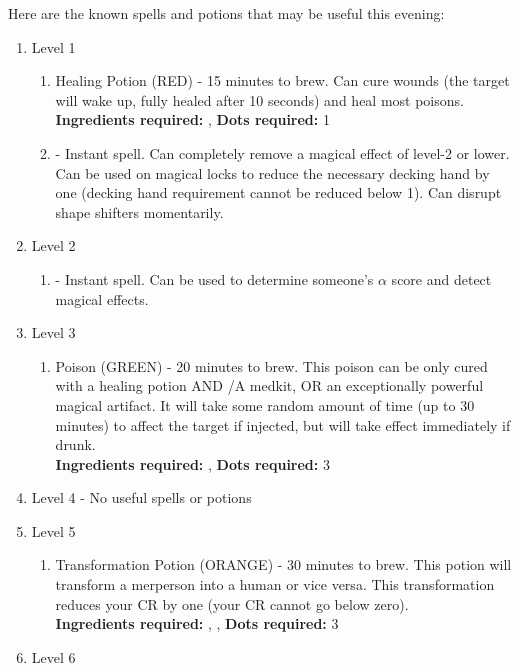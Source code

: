 \documentclass[green]{NeptuneBall}
\begin{document}
Here are the known spells and potions that may be useful this evening:
\begin{enumerate}
  \item Level 1
   \begin{enumerate}
     \item Healing Potion (RED) - 15 minutes to brew. Can cure wounds (the target will wake up, fully healed after 10 seconds) and heal most poisons.\\ 
     {\bf Ingredients required:} \iSeaSnake{}, \iSeaFan{}
		 {\bf Dots required:} 1
     \item \aLesserDispel{} - Instant spell. Can completely remove a magical effect of level-2 or lower. Can be used on magical locks to reduce the necessary decking hand by one (decking hand requirement cannot be reduced below 1). Can disrupt shape shifters momentarily.
   \end{enumerate}
  \item Level 2
   \begin{enumerate}
     \item \aPerceive{} - Instant spell. Can be used to determine someone's $\alpha$ score and detect magical effects.
   \end{enumerate}
  \item Level 3
     \begin{enumerate}
     \item Poison (GREEN) - 20 minutes to brew. This poison can be only cured with a healing potion AND \aFirstAid{}/A medkit, OR an exceptionally powerful magical artifact. It will take some random amount of time (up to 30 minutes) to affect the target if injected, but will take effect immediately if drunk.\\
     {\bf Ingredients required:} \iSeaUrchins{}, \iAnglerFish{}
		 {\bf Dots required:} 3
   \end{enumerate}
   \item Level 4 - No useful spells or potions
   \item Level 5
    \begin{enumerate}
     \item Transformation Potion (ORANGE) - 30 minutes to brew. This potion will transform a merperson into a human or vice versa. This transformation reduces your CR by one (your CR cannot go below zero).\\
      {\bf Ingredients required:} \iSquid{}, \iSponge{}, \iBarnacle{}
			{\bf Dots required:} 3
   \end{enumerate}
   \item Level 6

\end{enumerate}
\end{document}
